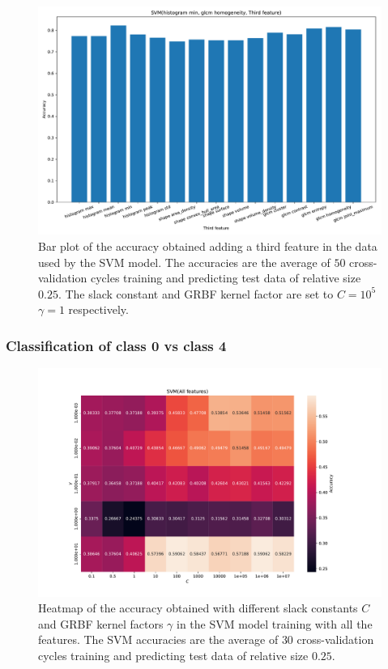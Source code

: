 \begin{figure}[H]
\centering
\includegraphics[width=1\textwidth]{Figures/third_feature0}
\caption{Bar plot of the accuracy obtained adding a third feature in the data used 
by the SVM model. The accuracies are the average 
of $50$ cross-validation cycles training and predicting test data of relative size $0.25$.
The slack constant and GRBF kernel factor are set to $C=10^5$  $\gamma=1 $ respectively. }
\label{fig:Figures-third_feature0}
\end{figure}

\subsubsection{Classification of class 0 vs class 4}

\begin{figure}[H]
\centering
\includegraphics[width=1\textwidth]{Figures/accuracy(C,gamma)1}
\caption{Heatmap of the accuracy obtained with different slack constants $C$ and 
GRBF kernel factors $\gamma $ in the SVM model training with all the features. The SVM accuracies are the average of $30$ cross-validation 
cycles training and predicting test data of relative size $0.25$.}
\label{fig:Figures-accuracy-C-gamma-1}
\end{figure}

